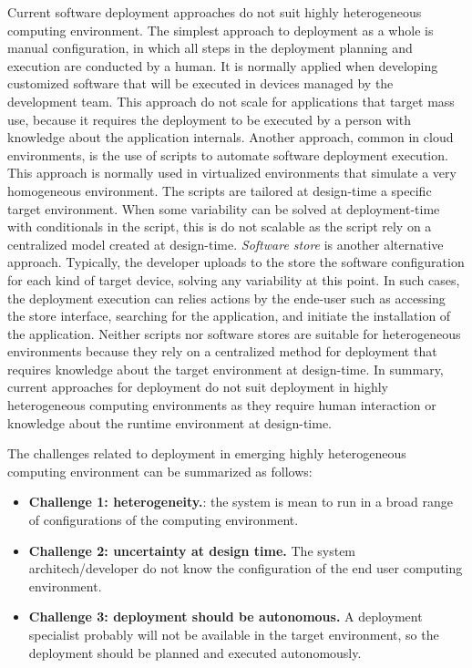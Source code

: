 Current software deployment approaches do not suit highly heterogeneous computing environment.
The simplest approach to deployment as a whole is manual configuration, in which all steps in the deployment planning and execution are conducted by a human. It is normally applied when developing customized software that will be executed in devices managed by the development team. This approach do not scale for applications that target mass use, because it requires the deployment to be executed by a person with knowledge about the application internals.
Another approach, common in cloud environments, is the use of scripts to automate software deployment execution. This approach is normally used in virtualized environments that simulate a very homogeneous environment. The scripts are tailored at design-time a specific target environment. When some variability can be solved at deployment-time with conditionals in the script, this is do not scalable as the script rely on a centralized model created at design-time.
\emph{Software store} is another alternative approach. Typically, the developer uploads to the store the software configuration for each kind of target device, solving any variability at this point.
In such cases, the deployment execution can relies actions by the ende-user such as accessing the store interface, searching for the application, and initiate the installation of the application.
Neither scripts nor software stores are suitable for heterogeneous environments because they rely on a centralized method for deployment that requires knowledge about the target environment at design-time. In summary, current approaches for deployment do not suit deployment in highly heterogeneous computing environments as they require human interaction or knowledge about the runtime environment at design-time.

The challenges related to deployment in emerging highly heterogeneous computing environment can be summarized as follows:

\begin{itemize}
  \item \textbf{ Challenge 1: heterogeneity.}: the system is mean to run in a broad range of configurations of the computing environment.

  \item \textbf{ Challenge 2: uncertainty at design time.} The system architech/developer do not know the configuration of the end user computing environment.

  \item \textbf{ Challenge 3: deployment should be autonomous.} A deployment specialist probably will not be available in the target environment, so the deployment should be planned and executed autonomously.
\end{itemize}







